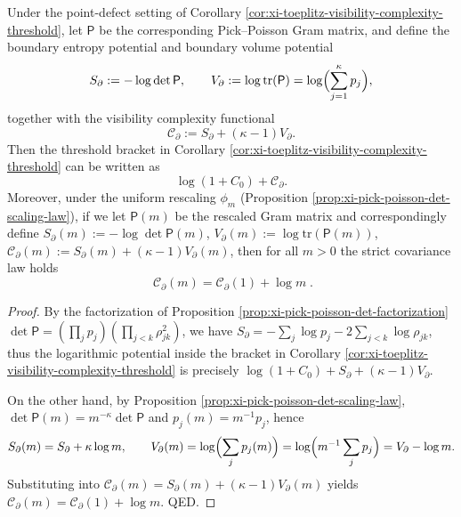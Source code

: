 
\begin{corollary}[Visibility Complexity "Anomaly" Covariance Law Under Uniform Rescaling: \texorpdfstring{$\mathscr{C}_{\partial}(m)=\mathscr{C}_{\partial}(1)+\log m$}{C(m)=C(1)+log m}]\label{cor:xi-toeplitz-visibility-complexity-anomaly}
Under the point-defect setting of Corollary \ref{cor:xi-toeplitz-visibility-complexity-threshold}, let \(\mathsf P\) be the corresponding Pick--Poisson Gram matrix, and define the boundary entropy potential and boundary volume potential
\[
S_{\partial}:=-\log\det\mathsf P,
\qquad
V_{\partial}:=\log\mathrm{tr}(\mathsf P)=\log\Bigl(\sum_{j=1}^{\kappa}p_j\Bigr),
\]
together with the visibility complexity functional
\[
\mathscr{C}_{\partial}:=S_{\partial}+(\kappa-1)V_{\partial}.
\]
Then the threshold bracket in Corollary \ref{cor:xi-toeplitz-visibility-complexity-threshold} can be written as
\[
\log(1+C_0)+\mathscr{C}_{\partial}.
\]
Moreover, under the uniform rescaling \(\phi_m\) (Proposition \ref{prop:xi-pick-poisson-det-scaling-law}), if we let \(\mathsf P(m)\) be the rescaled Gram matrix and correspondingly define
\(
S_{\partial}(m):=-\log\det\mathsf P(m)
\), \(V_{\partial}(m):=\log\mathrm{tr}(\mathsf P(m))\), \(\mathscr{C}_{\partial}(m):=S_{\partial}(m)+(\kappa-1)V_{\partial}(m)\),
then for all \(m>0\) the strict covariance law holds
\[
\boxed{\;
\mathscr{C}_{\partial}(m)=\mathscr{C}_{\partial}(1)+\log m\; }.
\]
\end{corollary}
\begin{proof}
By the factorization of Proposition \ref{prop:xi-pick-poisson-det-factorization}
\(
\det\mathsf P=(\prod_j p_j)(\prod_{j<k}\rho_{jk}^2)
\),
we have
\(
S_{\partial}=-\sum_j\log p_j-2\sum_{j<k}\log\rho_{jk}
\),
thus the logarithmic potential inside the bracket in Corollary \ref{cor:xi-toeplitz-visibility-complexity-threshold} is precisely
\(
\log(1+C_0)+S_{\partial}+(\kappa-1)V_{\partial}
\).
\par
On the other hand, by Proposition \ref{prop:xi-pick-poisson-det-scaling-law},
\(
\det\mathsf P(m)=m^{-\kappa}\det\mathsf P
\)
and \(p_j(m)=m^{-1}p_j\), hence
\[
S_{\partial}(m)=S_{\partial}+\kappa\log m,
\qquad
V_{\partial}(m)=\log\Bigl(\sum_j p_j(m)\Bigr)=\log\Bigl(m^{-1}\sum_j p_j\Bigr)=V_{\partial}-\log m.
\]
Substituting into \(\mathscr{C}_{\partial}(m)=S_{\partial}(m)+(\kappa-1)V_{\partial}(m)\) yields
\(
\mathscr{C}_{\partial}(m)=\mathscr{C}_{\partial}(1)+\log m
\).
QED.
\end{proof}

